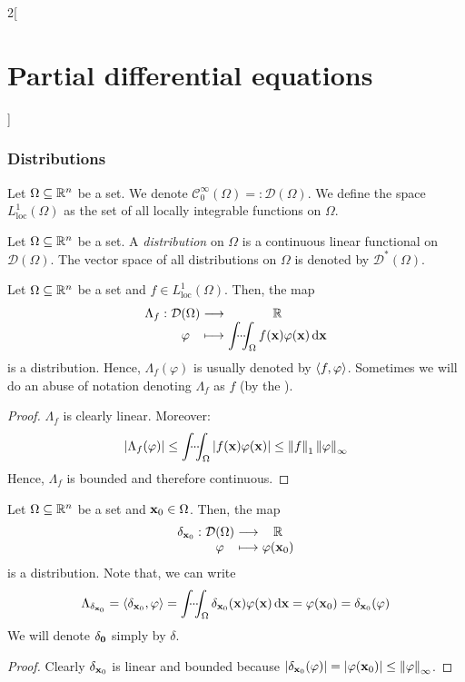 \documentclass[../../../main_math.tex]{subfiles}
\begin{document}
\begin{multicols}{2}[\section{Partial differential equations}]
  \subsubsection{Distributions}
  \begin{definition}
    Let $\Omega\subseteq \mathbb{R}^n$ be a set. We denote $\mathcal{C}_0^\infty(\Omega)=:\mathcal{D}(\Omega)$. We define the space $L_{\mathrm{loc}}^1(\Omega)$ as the set of all locally integrable functions on $\Omega$.
  \end{definition}
  \begin{definition}[Distribution]
    Let $\Omega\subseteq \mathbb{R}^n$ be a set. A \emph{distribution} on $\Omega$ is a continuous linear functional on $\mathcal{D}(\Omega)$. The vector space of all distributions on $\Omega$ is denoted by $\mathcal{D}^*(\Omega)$.
  \end{definition}
  \begin{proposition}
    Let $\Omega\subseteq \mathbb{R}^n$ be a set and $f\in L_{\mathrm{loc}}^1(\Omega)$. Then, the map
    $$
      \function{\Lambda_f}{\mathcal{D}(\Omega)}{\RR}{\varphi}{\displaystyle\idotsint_\Omega f(\vf{x})\varphi(\vf{x})\dd{\vf{x}}}
    $$
    is a distribution. Hence, $\Lambda_f(\varphi)$ is usually denoted by ${\left\langle f,\varphi\right\rangle}$. Sometimes we will do an abuse of notation denoting $\Lambda_f$ as $f$ (by the ).
  \end{proposition}
  \begin{proof}
    $\Lambda_f$ is clearly linear. Moreover: $$\abs{\Lambda_f(\varphi)}\leq\idotsint_\Omega\abs{f(\boldsymbol{\mathrm{x}})\varphi(\boldsymbol{\mathrm{x}})}\leq \left\|f\right\|_1\left\|\varphi\right\|_\infty$$
    Hence, $\Lambda_f$ is bounded and therefore continuous.
  \end{proof}
  \begin{proposition}
    Let $\Omega\subseteq \mathbb{R}^n$ be a set and $\boldsymbol{\mathrm{x}}_0\in\Omega$. Then, the map
    $$
      \function{\delta_{\vf{x}_0}}{\mathcal{D}(\Omega)}{\RR}{\varphi}{\varphi(\vf{x}_0)}
    $$
    is a distribution. Note that, we can write $$\Lambda_{\delta_{\boldsymbol{\mathrm{x}}_0}}={\left\langle\delta_{\boldsymbol{\mathrm{x}}_0},\varphi\right\rangle}=\idotsint_\Omega\delta_{\boldsymbol{\mathrm{x}}_0}(\boldsymbol{\mathrm{x}})\varphi(\boldsymbol{\mathrm{x}})\dd{\boldsymbol{\mathrm{x}}}=\varphi(\boldsymbol{\mathrm{x}}_0)=\delta_{\boldsymbol{\mathrm{x}}_0}(\varphi)$$ We will denote $\delta_{\boldsymbol{\mathrm{0}}}$ simply by $\delta$.
  \end{proposition}
  \begin{proof}
    Clearly $\delta_{\boldsymbol{\mathrm{x}}_0}$ is linear and bounded because $\abs{\delta_{\boldsymbol{\mathrm{x}}_0}(\varphi)}=\abs{\varphi(\boldsymbol{\mathrm{x}}_0)}\leq \left\|\varphi\right\|_\infty$.

\end{proof}
\end{multicols}
\end{document}
